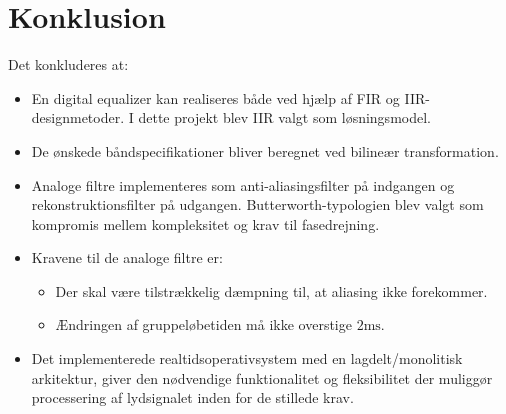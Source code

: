 \chapter{Konklusion} \label{kap:konklusion}
Det konkluderes at:
\begin{itemize}
	\item En digital equalizer kan realiseres både ved hjælp af FIR og IIR-designmetoder. I dette projekt blev IIR valgt som løsningsmodel.
	\item De ønskede båndspecifikationer bliver beregnet ved bilineær transformation.
	\item Analoge filtre implementeres som anti-aliasingsfilter på indgangen og rekonstruktionsfilter på udgangen. Butterworth-typologien blev valgt som kompromis mellem kompleksitet og krav til fasedrejning.
	\item Kravene til de analoge filtre er: 
	\begin{itemize}
		\item Der skal være tilstrækkelig dæmpning til, at aliasing ikke forekommer. 
		\item Ændringen af gruppeløbetiden må ikke overstige $2\si{\milli\second}$.
	\end{itemize}
	\item Det implementerede realtidsoperativsystem med en lagdelt/monolitisk arkitektur, giver den nødvendige funktionalitet og fleksibilitet der muliggør processering af lydsignalet inden for de stillede krav. 
\end{itemize}
